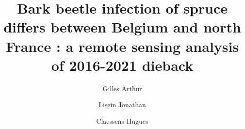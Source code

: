 \documentclass[3p,times]{elsarticle}
\begin{document}
\begin{frontmatter}


\author[label2]{Gilles Arthur}
\author[label2]{Lisein Jonathan}
\author[label2]{Claessens Hugues}




\title{Bark beetle infection of spruce differs between Belgium and north France : a remote sensing analysis of 2016-2021 dieback}


\end{frontmatter}
\end{document}
